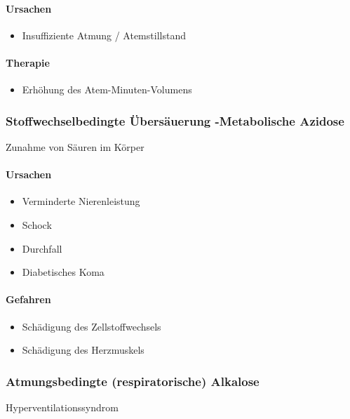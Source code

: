 \paragraph{Ursachen}

\begin{itemize}
    \item Insuffiziente Atmung / Atemstillstand
\end{itemize}

\paragraph{Therapie}

\begin{itemize}
    \item Erh\"ohung des Atem-Minuten-Volumens
\end{itemize}


\subsubsection{Stoffwechselbedingte \"Ubers\"auerung
-Metabolische Azidose} Zunahme von S\"auren im  K\"orper

\paragraph{Ursachen}

\begin{itemize}
    \item Verminderte Nierenleistung
    \item Schock
    \item Durchfall
    \item Diabetisches Koma
\end{itemize}

\paragraph{Gefahren}

\begin{itemize}
    \item Sch\"adigung des Zellstoffwechsels
    \item Sch\"adigung des Herzmuskels
\end{itemize}

\subsubsection{Atmungsbedingte (respiratorische) Alkalose}
Hyperventilationssyndrom

